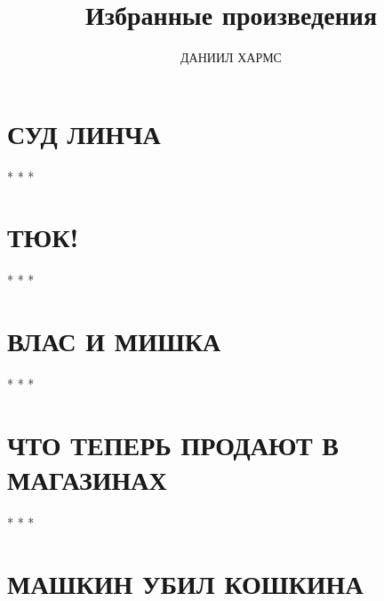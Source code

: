 \documentclass[oneside,openany]{book}
\begin{document}
\author{ДАНИИЛ ХАРМС}
\title{Избранные произведения}

\maketitle

\chapter*{СУД ЛИНЧА}
\vspace{1em}

\centerline{* * *}

\chapter*{ТЮК!}
\vspace{1em}

\centerline{* * *}

\chapter*{ВЛАС И МИШКА}
\vspace{1em}

\centerline{* * *}

\chapter*{ЧТО ТЕПЕРЬ ПРОДАЮТ В МАГАЗИНАХ}
\vspace{1em}

\centerline{* * *}

\chapter*{МАШКИН УБИЛ КОШКИНА}
\vspace{1em}

\end{document}
